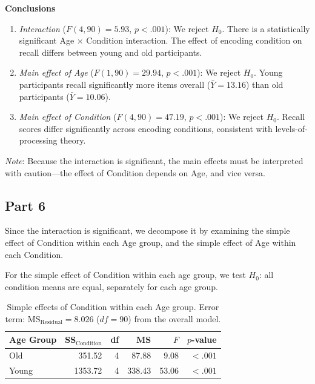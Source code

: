 \documentclass[letterpaper]{article}
\begin{document}
	\textbf{Conclusions}
	
	\begin{enumerate}
		\item \textit{Interaction} ($F(4, 90) = 5.93$, $p < .001$): We reject $H_0$. There is a statistically significant Age $\times$ Condition interaction. The effect of encoding condition on recall differs between young and old participants.
		
		\item \textit{Main effect of Age} ($F(1, 90) = 29.94$, $p < .001$): We reject $H_0$. Young participants recall significantly more items overall ($\bar{Y} = 13.16$) than old participants ($\bar{Y} = 10.06$).
		
		\item \textit{Main effect of Condition} ($F(4, 90) = 47.19$, $p < .001$): We reject $H_0$. Recall scores differ significantly across encoding conditions, consistent with levels-of-processing theory.
	\end{enumerate}
	
	\noindent\textit{Note}: Because the interaction is significant, the main effects must be interpreted with caution---the effect of Condition depends on Age, and vice versa.
	
	\subsection{Part 6}
	
	Since the interaction is significant, we decompose it by examining the {simple effect of Condition within each Age group}, and the {simple effect of Age within each Condition}.
	
	For the {simple effect of Condition within each age group}, we test $H_0$: all condition means are equal, separately for each age group.
	
	\begin{table}[H]
		\centering
		\begin{tabular}{lrrrrr}
			\toprule
			Age Group & SS$_{\text{Condition}}$ & df & MS & $F$ & $p$-value \\
			\midrule
			Old   & 351.52  & 4 & 87.88  & 9.08  & $< .001$ \\
			Young & 1353.72 & 4 & 338.43 & 53.06 & $< .001$ \\
			\bottomrule
		\end{tabular}
		\caption{Simple effects of Condition within each Age group. Error term: MS$_{\text{Residual}} = 8.026$ ($df = 90$) from the overall model.}
	\end{table}
	
\end{document}
